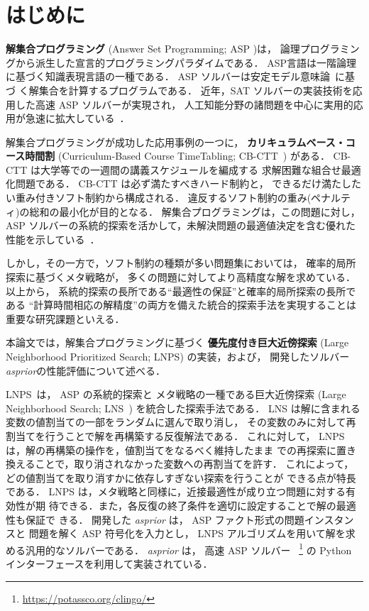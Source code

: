 \chapter{はじめに}


\textbf{解集合プログラミング}
(Answer Set Programming; ASP
\cite{%
  baral03:cambridge,%
  DBLP:conf/iclp/GelfondL88,%
  DBLP:journals/amai/Niemela99})は，
論理プログラミングから派生した宣言的プログラミングパラダイムである．
ASP言語は一階論理に基づく知識表現言語の一種である．
ASP ソルバーは安定モデル意味論~\cite{DBLP:conf/iclp/GelfondL88}に基づ
く解集合を計算するプログラムである．
近年，SAT ソルバーの実装技術を応用した高速 ASP ソルバーが実現され，
人工知能分野の諸問題を中心に実用的応用が急速に拡大している~\cite{ergele16a}．

解集合プログラミングが成功した応用事例の一つに，
\textbf{カリキュラムベース・コース時間割}
(Curriculum-Based Course TimeTabling; CB-CTT~\cite{%
  anor/Banbara2019,DBLP:journals/anor/BonuttiCGS12})
がある．
CB-CTT は大学等での一週間の講義スケジュールを編成する
求解困難な組合せ最適化問題である．
CB-CTT は必ず満たすべきハード制約と，
できるだけ満たしたい重み付きソフト制約から構成される．
違反するソフト制約の重み(ペナルティ)の総和の最小化が目的となる．
解集合プログラミングは，この問題に対し，
ASP ソルバーの系統的探索を活かして，未解決問題の最適値決定を含む優れた
性能を示している~\cite{anor/Banbara2019}．

しかし，その一方で，ソフト制約の種類が多い問題集においては，
確率的局所探索に基づくメタ戦略が，
多くの問題に対してより高精度な解を求めている．
以上から，
系統的探索の長所である``最適性の保証''と確率的局所探索の長所である
``計算時間相応の解精度''の両方を備えた統合的探索手法を実現することは
重要な研究課題といえる．

本論文では，解集合プログラミングに基づく
\textbf{優先度付き巨大近傍探索}
(Large Neighborhood Prioritized Search; LNPS)
の実装，および，
開発したソルバー \textit{asprior}の性能評価について述べる．

LNPS~\cite{jsai2021:kutaba}は，
ASP の系統的探索と
メタ戦略の一種である巨大近傍探索
(Large Neighborhood Search; LNS~\cite{Pisinger10})
を統合した探索手法である．
%
LNS は解に含まれる変数の値割当ての一部をランダムに選んで取り消し，
その変数のみに対して再割当てを行うことで解を再構築する反復解法である．
これに対して，
LNPS は，解の再構築の操作を，値割当てをなるべく維持したまま
での再探索に置き換えることで，取り消されなかった変数への再割当てを許す．
これによって，どの値割当てを取り消すかに依存しすぎない探索を行うことが
できる点が特長である．
LNPS は，メタ戦略と同様に，近接最適性が成り立つ問題に対する有効性が期
待できる．また，各反復の終了条件を適切に設定することで解の最適性も保証で
きる．
開発した \textit{asprior} は，
ASP ファクト形式の問題インスタンスと
問題を解く ASP 符号化を入力とし，
LNPS アルゴリズムを用いて解を求める汎用的なソルバーである．
\textit{asprior} は，
高速 ASP ソルバー {\clingo}~\footnote{\url{https://potassco.org/clingo/}}
の Python インターフェースを利用して実装されている．

